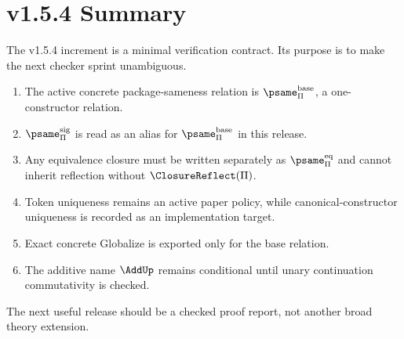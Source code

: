 
\chapter{v1.5.4 Summary}
\label{ch:v154-summary}

The v1.5.4 increment is a minimal verification contract. Its purpose is to make the next checker sprint unambiguous.

\begin{enumerate}
  \item The active concrete package-sameness relation is \(\psame_{\Pi}^{\mathrm{base}}\), a one-constructor relation.
  \item \(\psame_{\Pi}^{\mathrm{sig}}\) is read as an alias for \(\psame_{\Pi}^{\mathrm{base}}\) in this release.
  \item Any equivalence closure must be written separately as \(\psame_{\Pi}^{\mathrm{eq}}\) and cannot inherit reflection without \(\ClosureReflect(\Pi)\).
  \item Token uniqueness remains an active paper policy, while canonical-constructor uniqueness is recorded as an implementation target.
  \item Exact concrete Globalize is exported only for the base relation.
  \item The additive name \(\AddUp\) remains conditional until unary continuation commutativity is checked.
\end{enumerate}

The next useful release should be a checked proof report, not another broad theory extension.

